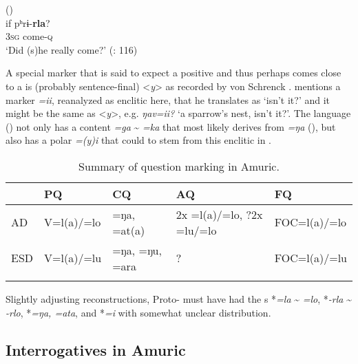 \ea%
    \label{ex:amur:11}
     ()\\
    \gll if  pʰrɨ-\textbf{{rla}}?\\
    3\textsc{sg}  come-\textsc{q}\\
    \glt ‘Did (s)he really come?’ (\citealt{NedjalkovOtaina2013}: 116)
    \z

A special marker that is said to expect a positive  and thus perhaps comes close to a  is (probably sentence-final) <\textit{y}> as recorded by von Schrenck \citep{Grube1892}. \citet[262]{Austerlitz1956} mentions a marker \textit{=ii}, reanalyzed as enclitic here, that he translates as ‘isn’t it?’ and it might be the same as <\textit{y}>, e.g. \textit{ŋav=ii?} ‘a sparrow’s nest, isn’t it?’. The  language  () not only has a content  \textit{=ga} {\textasciitilde} \textit{=ka} that most likely derives from  \textit{=ŋa} (), but also has a polar  \textit{=(y)i} that could to stem from this enclitic in .

\begin{table}
\caption{Summary of question marking in Amuric.}
\label{tab:amur:1}

\begin{tabularx}{\textwidth}{XXXXX}
\lsptoprule
& \textbf{PQ} & \textbf{CQ} & \textbf{AQ} & \textbf{FQ}\\
\midrule
AD & V=l(a)/=lo & =ŋa, =at(a) & 2x =l(a)/=lo, ?2x =lu/=lo & FOC=l(a)/=lo\\
ESD & V=l(a)/=lu & =ŋa, =ŋu, =ara & ? & FOC=l(a)/=lu\\
\lspbottomrule
\end{tabularx}
\end{table}

Slightly adjusting  reconstructions, Proto- must have had the s *\textit{=la} {\textasciitilde} \textit{=lo}, *\textit{-rla} {\textasciitilde} \textit{-rlo}, *\textit{=ŋa, =ata}, and *\textit{=i} with somewhat unclear distribution.

\subsection{Interrogatives in Amuric}\label{sec:5.2.3}

